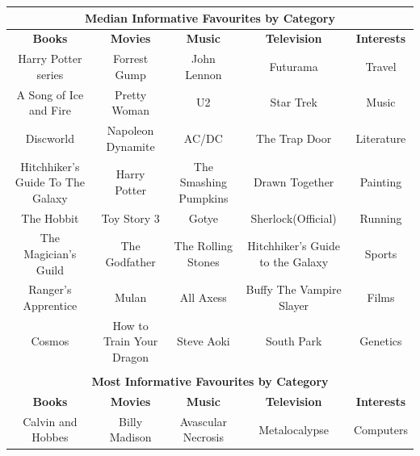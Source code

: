 \begin{table}[t!] \centering 

{\small
\begin{tabular}{|c|c|c|c|c|}
\hline 
\multicolumn{5}{|c|}{\textbf{Median Informative Favourites by Category}}\\
\hline 
\textbf{Books} & \textbf{Movies} & \textbf{Music} & \textbf{Television} & \textbf{Interests} \\
\hline \hline
Harry Potter series&Forrest Gump&John Lennon&Futurama&Travel\\
\hline
A Song of Ice and Fire&Pretty Woman&U2&Star Trek&Music\\
\hline
Discworld&Napoleon Dynamite&AC/DC&The Trap Door&Literature\\
\hline
Hitchhiker's Guide To The Galaxy&Harry Potter&The Smashing Pumpkins&Drawn Together&Painting\\
\hline
The Hobbit&Toy Story 3&Gotye&Sherlock(Official)&Running\\
\hline
The Magician's Guild&The Godfather&The Rolling Stones&Hitchhiker's Guide to the Galaxy&Sports\\
\hline
Ranger's Apprentice&Mulan&All Axess&Buffy The Vampire Slayer&Films\\
\hline
Cosmos&How to Train Your Dragon&Steve Aoki&South Park&Genetics\\
\hline
\multicolumn{5}{c}{}\\
\hline 
\multicolumn{5}{|c|}{\textbf{Most Informative Favourites by Category}}\\
\hline
\textbf{Books} & \textbf{Movies} & \textbf{Music} & \textbf{Television} & \textbf{Interests} \\
\hline \hline
Calvin and Hobbes & Billy Madison & Avascular Necrosis & Metalocalypse & Computers\\

\end{tabular}}
\end{table}
